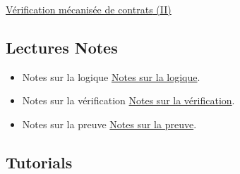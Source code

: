 \documentclass[ 12pt]{article}
\begin{document}
\href{http://mery54.github.io/teaching/movex/lecturesnotes/movexlecture5.pdf}{{Vérification  mécanisée de contrats} (II)}



  

  \subsection{Lectures Notes}

  \begin{itemize}
  \item[]   Notes sur la logique
    \href{http://mery54.github.io/teaching/movex/lecturesnotes/preprint-chapterlogique.pdf}{Notes sur la logique}.

     \item[]   Notes sur la vérification
    \href{http://mery54.github.io/teaching/movex/lecturesnotes/preprint-chapterverification.pdf}{Notes
      sur la vérification}.

     \item[]   Notes sur la preuve
    \href{http://mery54.github.io/teaching/movex/lecturesnotes/preprint-chapterprouver.pdf}{Notes
      sur la preuve}.

  \end{itemize}


  

\subsection{Tutorials}
\end{document}
